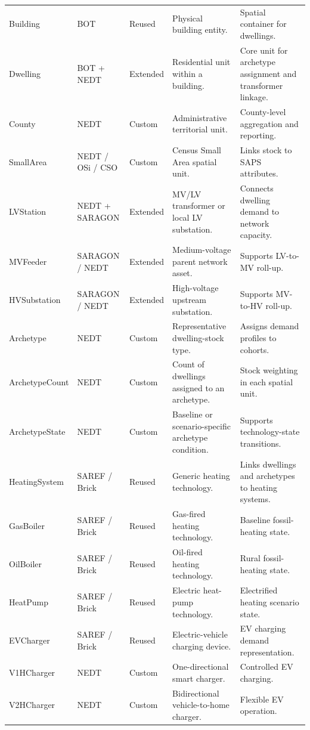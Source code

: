 \documentclass[preprint,12pt]{elsarticle}
\begin{document}
\begin{longtable}{P{2.7cm} P{2cm} P{2.2cm} P{4cm} P{3.4cm}}
Building & BOT & Reused &
  Physical building entity. &
  Spatial container for dwellings. \\
Dwelling & BOT + NEDT & Extended &
  Residential unit within a building. &
  Core unit for archetype assignment and transformer linkage. \\
County & NEDT & Custom &
  Administrative territorial unit. &
  County-level aggregation and reporting. \\
SmallArea & NEDT / OSi / CSO & Custom &
  Census Small Area spatial unit. &
  Links stock to SAPS attributes. \\
LVStation & NEDT + SARAGON & Extended &
  MV/LV transformer or local LV substation. &
  Connects dwelling demand to network capacity. \\
MVFeeder & SARAGON / NEDT & Extended &
  Medium-voltage parent network asset. &
  Supports LV-to-MV roll-up. \\
HVSubstation & SARAGON / NEDT & Extended &
  High-voltage upstream substation. &
  Supports MV-to-HV roll-up. \\
Archetype & NEDT & Custom &
  Representative dwelling-stock type. &
  Assigns demand profiles to cohorts. \\
ArchetypeCount & NEDT & Custom &
  Count of dwellings assigned to an archetype. &
  Stock weighting in each spatial unit. \\
ArchetypeState & NEDT & Custom &
  Baseline or scenario-specific archetype condition. &
  Supports technology-state transitions. \\
HeatingSystem & SAREF / Brick & Reused &
  Generic heating technology. &
  Links dwellings and archetypes to heating systems. \\
GasBoiler & SAREF / Brick & Reused &
  Gas-fired heating technology. &
  Baseline fossil-heating state. \\
OilBoiler & SAREF / Brick & Reused &
  Oil-fired heating technology. &
  Rural fossil-heating state. \\
HeatPump & SAREF / Brick & Reused &
  Electric heat-pump technology. &
  Electrified heating scenario state. \\
EVCharger & SAREF / Brick & Reused &
  Electric-vehicle charging device. &
  EV charging demand representation. \\
V1HCharger & NEDT & Custom &
  One-directional smart charger. &
  Controlled EV charging. \\
V2HCharger & NEDT & Custom &
  Bidirectional vehicle-to-home charger. &
  Flexible EV operation. \\

\end{longtable}
\end{document}
